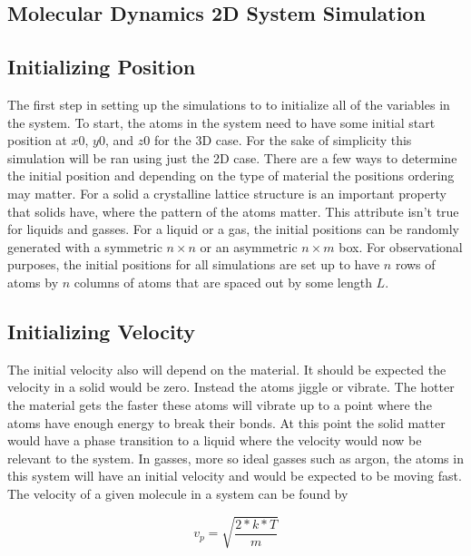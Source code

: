 \documentclass[reprint,amsmath,amssymb, aps, 10pt, a4paper, english, reqno]{revtex4-1}
\begin{document}
\begin{multicols}{2}
\section{Molecular Dynamics 2D System Simulation}


\subsection{Initializing Position}

The first step in setting up the simulations to to initialize all of the variables in the system. To start, the atoms in the system need to have some initial start position at $x0$, $y0$, and $z0$ for the 3D case. For the sake of simplicity this simulation will be ran using just the 2D case. There are a few ways to determine the initial position and depending on the type of material the positions ordering may matter. For a solid a crystalline lattice structure is an important property that solids have, where the pattern of the atoms matter. This attribute isn't true for liquids and gasses. For a liquid or a gas, the initial positions can be randomly generated with a symmetric $n \times n$ or an asymmetric $n \times m$ box. For observational purposes, the initial positions for all simulations are set up to have $n$ rows of atoms by $n$ columns of atoms that are spaced out by some length $L$. 

\subsection{Initializing Velocity}

The initial velocity also will depend on the material. It should be expected the velocity in a solid would be zero. Instead the atoms jiggle or vibrate. The hotter the material gets the faster these atoms will vibrate up to a point where the atoms have enough energy to break their bonds. At this point the solid matter would have a phase transition to a liquid where the velocity would now be relevant to the system. In gasses, more so ideal gasses such as argon, the atoms in this system will have an initial velocity and would be expected to be moving fast. The velocity of a given molecule in a system can be found by

\begin{equation}
    v_{p} = \sqrt{\frac{2*k*T}{m}}
\end{equation}


\end{multicols}
\end{document}
